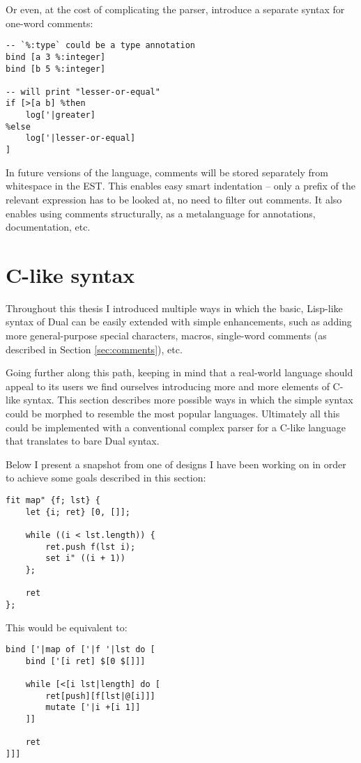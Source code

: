 Or even, at the cost of complicating the parser, introduce a separate syntax for
one-word comments:
\begin{lstlisting}
-- `%:type` could be a type annotation
bind [a 3 %:integer]
bind [b 5 %:integer]

-- will print "lesser-or-equal"
if [>[a b] %then
    log['|greater]
%else
    log['|lesser-or-equal]
]
\end{lstlisting}

In future versions of the language, comments will be stored separately from
whitespace in the EST. This enables easy smart indentation -- only a prefix of
the relevant expression has to be looked at, no need to filter out comments. It
also enables using comments structurally, as a metalanguage for annotations,
documentation, etc.

\section{C-like syntax}
Throughout this thesis I introduced multiple ways in which the basic, Lisp-like
syntax of Dual can be easily extended with simple enhancements, such as adding
more general-purpose special characters, macros, single-word comments (as
described in Section \ref{sec:comments}), etc.

Going further along this path, keeping in mind that a real-world language should
appeal to its users we find ourselves introducing more and more elements of
C-like syntax. This section describes more possible ways in which the simple
syntax could be morphed to resemble the most popular languages.  Ultimately all
this could be implemented with a conventional complex parser for a C-like
language that translates to bare Dual syntax.

Below I present a snapshot from one of designs I have been working on in order
to achieve some goals described in this section:
\begin{lstlisting}
fit map" {f; lst} {
    let {i; ret} [0, []];

    while ((i < lst.length)) {
        ret.push f(lst i);
        set i" ((i + 1))
    };
    
    ret
};
\end{lstlisting}

This would be equivalent to:
\begin{lstlisting}
bind ['|map of ['|f '|lst do [
    bind ['[i ret] $[0 $[]]]

    while [<[i lst|length] do [
        ret[push][f[lst|@[i]]]
        mutate ['|i +[i 1]]
    ]]
    
    ret
]]]
\end{lstlisting}


